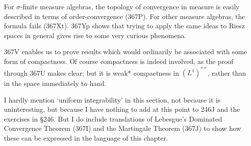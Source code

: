 {For $\sigma$-finite measure algebras, the topology of convergence in
measure is easily described in terms of order-convergence (367P).
For other measure algebras, the formula fails (367Xt).
367Yp shows that trying to apply the same ideas to Riesz spaces in
general gives rise to some very curious phenomena.
     
367V enables us to prove results which would ordinarily be associated
with some form of compactness.   Of course compactness is indeed
involved, as the proof through 367U makes clear;  but it is weak*
compactness in $(L^1)^{**}$, rather than in the space immediately to
hand.
     
I hardly mention `uniform integrability' in this section, not because
it is uninteresting, but because I have nothing to add at this point to
246J and the exercises in \S246.   But I do include translations of
Lebesgue's Dominated Convergence Theorem (367I) and the Martingale
Theorem (367J) to show how these can be expressed in the language of
this chapter.
}%
     
\discrpage
     
